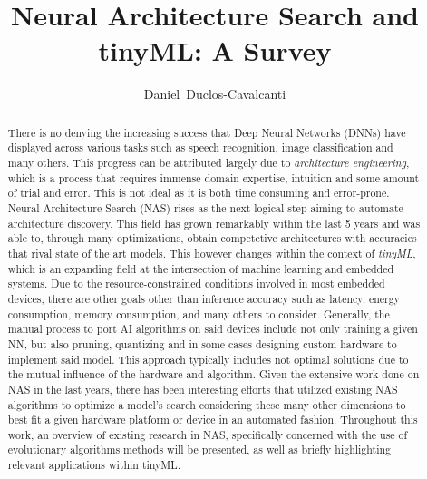 \documentclass[10pt,        %
               a4paper,     %
               journal,     %
               ]{IEEEtran}
\makeatletter
\def\markboth#1#2{\def\leftmark{\@IEEEcompsoconly{\sffamily}\MakeUppercase{\protect#1}}%
\def\rightmark{\@IEEEcompsoconly{\sffamily}\MakeUppercase{\protect#2}}}
\makeatother
\begin{document}
\title{Neural Architecture Search and tinyML: A Survey}
\author{Daniel~Duclos-Cavalcanti}

\markboth{Seminar for VLSI Entwurfsverfahren, Summer Term 2022}%
{Daniel Duclos-Cavalcanti: Network Architecture Search (NAS)}

\maketitle


\begin{abstract}
There is no denying the increasing success that Deep Neural Networks (DNNs)
have displayed across various tasks such as speech recognition, image classification
and many others. This progress can be attributed largely due to \textit{architecture engineering},
which is a process that requires immense domain expertise, intuition and some amount of trial
and error. This is not ideal as it is both time consuming and error-prone. Neural Architecture Search (NAS)
rises as the next logical step aiming to automate architecture discovery.
This field has grown remarkably within the last 5 years and was able to, through
many optimizations, obtain competetive architectures with accuracies that rival state of the art models.
This however changes within the context of \textit{tinyML}, which is an expanding field at the intersection of
machine learning and embedded systems.
Due to the resource-constrained conditions involved in most embedded devices, there are other goals other than inference
accuracy such as latency, energy consumption, memory consumption, and many others to consider. Generally, the manual
process to port AI algorithms on said devices include not only training a given NN, but also pruning, quantizing and
in some cases designing custom hardware to implement said model. This approach typically includes not optimal
solutions due to the mutual influence of the hardware and algorithm.
Given the extensive work done on NAS in the last years, there has been interesting efforts that
utilized existing NAS algorithms to optimize a model's search considering these many other dimensions to best fit a
given hardware platform or device in an automated fashion.
Throughout this work, an overview of existing research in NAS, specifically concerned
with the use of evolutionary algorithms methods will be presented, as well as briefly highlighting
relevant applications within tinyML.

\end{abstract}
\end{document}
